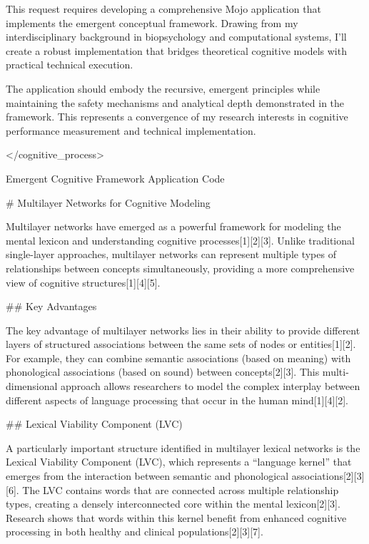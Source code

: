 {This request requires developing a comprehensive Mojo application that implements the emergent conceptual framework. Drawing from my interdisciplinary background in biopsychology and computational systems, I'll create a robust implementation that bridges theoretical cognitive models with practical technical execution.

The application should embody the recursive, emergent principles while maintaining the safety mechanisms and analytical depth demonstrated in the framework. This represents a convergence of my research interests in cognitive performance measurement and technical implementation.

</cognitive_process>


Emergent Cognitive Framework Application
Code















# Multilayer Networks for Cognitive Modeling

Multilayer networks have emerged as a powerful framework for modeling the mental lexicon and understanding cognitive processes[1][2][3]. Unlike traditional single-layer approaches, multilayer networks can represent multiple types of relationships between concepts simultaneously, providing a more comprehensive view of cognitive structures[1][4][5].

## Key Advantages

The key advantage of multilayer networks lies in their ability to provide different layers of structured associations between the same sets of nodes or entities[1][2]. For example, they can combine semantic associations (based on meaning) with phonological associations (based on sound) between concepts[2][3]. This multi-dimensional approach allows researchers to model the complex interplay between different aspects of language processing that occur in the human mind[1][4][2].

## Lexical Viability Component (LVC)

A particularly important structure identified in multilayer lexical networks is the Lexical Viability Component (LVC), which represents a “language kernel” that emerges from the interaction between semantic and phonological associations[2][3][6]. The LVC contains words that are connected across multiple relationship types, creating a densely interconnected core within the mental lexicon[2][3]. Research shows that words within this kernel benefit from enhanced cognitive processing in both healthy and clinical populations[2][3][7].

}
